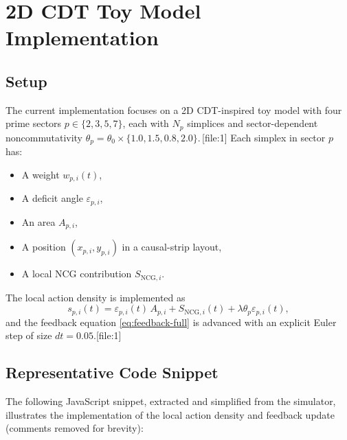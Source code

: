 \documentclass[11pt]{article}
\begin{document}
\section{2D CDT Toy Model Implementation}

\subsection{Setup}

The current implementation focuses on a 2D CDT-inspired toy model with
four prime sectors \(p \in \{2,3,5,7\}\), each with \(N_p\) simplices and
sector-dependent noncommutativity \(\theta_p = \theta_0 \times
\{1.0,1.5,0.8,2.0\}\).\,[file:1] Each simplex in sector \(p\) has:
\begin{itemize}
  \item A weight \(w_{p,i}(t)\),
  \item A deficit angle \(\varepsilon_{p,i}\),
  \item An area \(A_{p,i}\),
  \item A position \((x_{p,i},y_{p,i})\) in a causal-strip layout,
  \item A local NCG contribution \(S_{\mathrm{NCG},i}\).
\end{itemize}

The local action density is implemented as
\begin{equation}
  s_{p,i}(t)
    = \varepsilon_{p,i}(t)\,A_{p,i}
      + S_{\mathrm{NCG},i}(t)
      + \lambda \theta_p \varepsilon_{p,i}(t),
\end{equation}
and the feedback equation \eqref{eq:feedback-full} is advanced with an
explicit Euler step of size \(dt = 0.05\).[file:1]

\subsection{Representative Code Snippet}

The following JavaScript snippet, extracted and simplified from the
simulator, illustrates the implementation of the local action density and
feedback update (comments removed for brevity):
\end{document}

